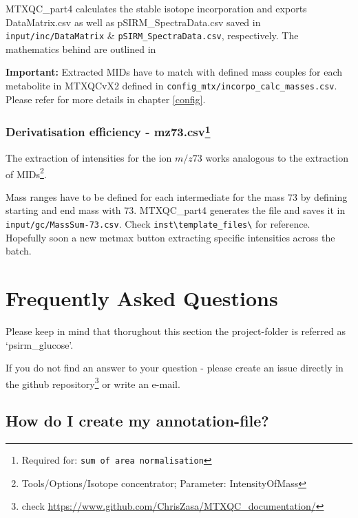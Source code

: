 \documentclass[]{book}
\let\rmarkdownfootnote\footnote%
\def\footnote{\protect\rmarkdownfootnote}
\begin{document}
MTXQC\_part4 calculates the stable isotope incorporation and exports DataMatrix.csv as well as pSIRM\_SpectraData.csv saved in \texttt{input/inc/DataMatrix} \& \texttt{pSIRM\_SpectraData.csv}, respectively. The mathematics behind are outlined in \citep{Pietzke2014}

\textbf{Important:}
Extracted MIDs have to match with defined mass couples for each metabolite in MTXQCvX2 defined in \texttt{config\_mtx/incorpo\_calc\_masses.csv}. Please refer for more details in chapter \ref{config}.

\hypertarget{derivatisation-efficiency---mz73.csv}{%
\subsection[Derivatisation efficiency - mz73.csv]{\texorpdfstring{Derivatisation efficiency - mz73.csv\footnote{Required for: \texttt{sum\ of\ area\ normalisation}}}{Derivatisation efficiency - mz73.csv}}\label{derivatisation-efficiency---mz73.csv}}

The extraction of intensities for the ion \(m/z 73\) works analogous to the extraction of MIDs\footnote{Tools/Options/Isotope concentrator; Parameter: IntensityOfMass}.

Mass ranges have to be defined for each intermediate for the mass 73 by defining starting and end mass with 73. MTXQC\_part4 generates the file and saves it in \texttt{input/gc/MassSum-73.csv}. Check \texttt{inst\textbackslash{}template\_files\textbackslash{}} for reference. Hopefully soon a new metmax button extracting specific intensities across the batch.

\hypertarget{FAQ}{%
\chapter{Frequently Asked Questions}\label{FAQ}}

Please keep in mind that thorughout this section the project-folder is referred as `psirm\_glucose'.

If you do not find an answer to your question - please create an issue directly in the github repository\footnote{check \url{https://www.github.com/ChrisZasa/MTXQC_documentation/}} or write an e-mail.

\hypertarget{createannotation}{%
\section{How do I create my annotation-file?}\label{createannotation}}
\end{document}
